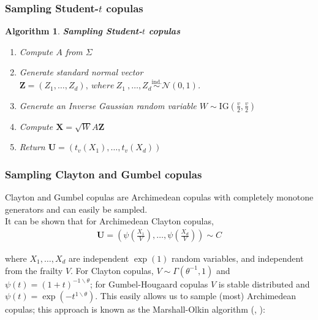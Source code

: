 \documentclass[12pt]{report}
\newtheorem{algorithmold}{Algorithm}[section]
\newcommand{\1}{\mathbf{1}}
\begin{document}
\begin{flushleft}
\subsubsection{Sampling Student-$t$ copulas}
\begin{algorithmold}\label{tCopulaResampling}
\textit{\normalfont\parencite{HofertBook}}\:
\textbf{Sampling Student-$t$ copulas}\\
\begin{enumerate}
\item Compute $A$ from $\Sigma$
\item Generate standard normal vector $\textbf{Z} = (Z_{1}, \dots, Z_{d}),\: where \: Z_{1}\:, \dots, Z_{d} \overset{\text{ind.}}{\sim} \mathcal{N}(0,1)$.
\item Generate an Inverse Gaussian random variable $W \sim \mathrm{IG} \left( \frac{v}{2}, \frac{v}{2} \right)$
\item Compute $\textbf{X} = \sqrt{W}A\textbf{Z}$
\item Return $\textbf{U} = (t_{v}(X_{1}), \dots, t_{v}(X_{d}))$
\end{enumerate}
\end{algorithmold}
\subsubsection{Sampling Clayton and Gumbel copulas}
Clayton and Gumbel copulas are Archimedean copulas with completely monotone generators and can easily be sampled. \\
\vspace{0.5cm}
It can be shown that \parencite{HofertBook} for Archimedean Clayton copulas,
\begin{align*}
\boldsymbol{U} = \left( \psi \left( \frac{X_{1}}{V} \right), \dots, \psi \left( \frac{X_{d}}{V} \right) \right) \sim C
\end{align*}

where $X_{1}, \dots, X_{d}$ are independent $\exp(1)$ random variables, and independent from the frailty $V$. For Clayton copulas, $V \sim \Gamma(\theta^{-1},1)$ and $\psi(t) = (1 + t)^{-1\backslash \theta}$; for Gumbel-Hougaard copulas $V$ is stable distributed and $\psi(t) = \exp(-t^{1\backslash\theta})$. This easily allows us to sample (most) Archimedean copulas; this approach is known as the Marshall-Olkin algorithm (\cite{MarshallOlkinAlgo1988}, \cite{HofertBook}):


\end{flushleft}
\end{document}
